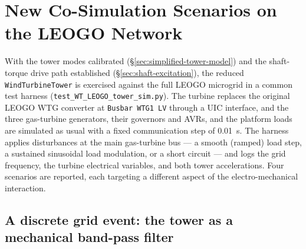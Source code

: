 
\section{New Co-Simulation Scenarios on the LEOGO Network}
\label{sec:new-tests}

With the tower modes calibrated (\S\ref{sec:simplified-tower-model}) and the
shaft-torque drive path established (\S\ref{sec:shaft-excitation}), the reduced
\texttt{WindTurbineTower} is exercised against the full LEOGO microgrid in a
common test harness (\texttt{test\_WT\_LEOGO\_tower\_sim.py}). The turbine
replaces the original LEOGO WTG converter at \texttt{Busbar WTG1 LV} through a
UIC interface, and the three gas-turbine generators, their governors and AVRs,
and the platform loads are simulated as usual with a fixed communication step of
\SI{0.01}{\second}. The harness applies disturbances at the main gas-turbine bus
--- a smooth (ramped) load step, a sustained sinusoidal load modulation, or a
short circuit --- and logs the grid frequency, the turbine electrical variables,
and both tower accelerations. Four scenarios are reported, each targeting a
different aspect of the electro-mechanical interaction.

\subsection{A discrete grid event: the tower as a mechanical band-pass filter}
\label{subsec:nt-gttrip}

